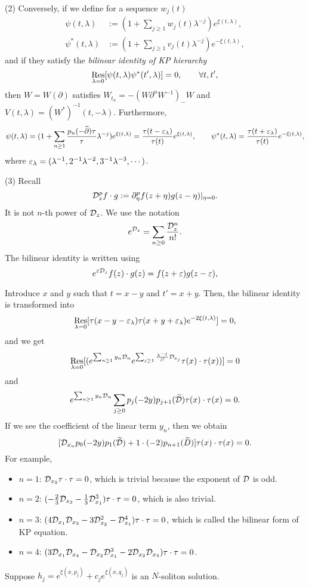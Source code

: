 \documentclass{../../../small}
\begin{document}
(2)
Conversely, if we define for a sequence $w_j(t)$
\begin{align*}
\psi(t,\lambda)&:=(1+\sum_{j\ge1}w_j(t)\lambda^{-j})e^{\xi(t,\lambda)},\\
\psi^*(t,\lambda)&:=(1+\sum_{j\ge1}v_j(t)\lambda^{-j})e^{-\xi(t,\lambda)},
\end{align*}
and if they satisfy the \emph{bilinear identity of KP hierarchy}
\[\operatorname*{Res}_{\lambda=0}[\psi(t,\lambda)\psi^*(t',\lambda)]=0,\qquad\forall t,t',\]
then $W=W(\partial)$ satisfies $W_{t_n}=-(W\partial^nW^{-1})_-W$ and $V(t,\lambda)=(W^*)^{-1}(t,-\lambda)$.
Furthermore,
\[\psi(t,\lambda)=(1+\sum_{n\ge1}\frac{p_n(-\widetilde\partial)\tau}\tau \lambda^{-j})e^{\xi(t,\lambda)}=\frac{\tau(t-\varepsilon_\lambda)}{\tau(t)}e^{\xi(t,\lambda)},\qquad \psi^*(t,\lambda)=\frac{\tau(t+\varepsilon_\lambda)}{\tau(t)}e^{-\xi(t,\lambda)},\]
where $\varepsilon_\lambda=(\lambda^{-1},2^{-1}\lambda^{-2},3^{-1}\lambda^{-3},\cdots)$.

(3)
Recall
\[\mathcal{D}_z^pf\cdot g:=\partial_\eta^pf(z+\eta)g(z-\eta)|_{\eta=0}.\]
It is not $n$-th power of $\mathcal{D}_z$.
We use the notation
\[e^{\mathcal{D}_z}=\sum_{n\ge0}\frac{\mathcal{D}_z^n}{n!}.\]
The bilinear identity is written using
\[e^{\varepsilon\mathcal{D}_z}f(z)\cdot g(z)=f(z+\varepsilon)g(z-\varepsilon),\]


Introduce $x$ and $y$ such that $t=x-y$ and $t'=x+y$.
Then, the bilinear identity is transformed into
\[\operatorname*{Res}_{\lambda=0}[\tau(x-y-\varepsilon_\lambda)\tau(x+y+\varepsilon_\lambda)e^{-2\xi(t,\lambda)}]=0,\]
and we get
\[\operatorname*{Res}_{\lambda=0}[(e^{\sum_{n\ge1}y_n\mathcal{D}_n}e^{\sum_{j\ge1}\frac{\lambda^{-j}}{j!}\mathcal{D}_{x_j}}\tau(x)\cdot\tau(x))]=0\]
and
\[e^{\sum_{n\ge1}y_n\mathcal{D}_n}\sum_{j\ge0}p_j(-2y)p_{j+1}(\widetilde{\mathcal{D}})\tau(x)\cdot\tau(x)=0.\]
If we see the coefficient of the linear term $y_n$, then we obtain
\[[\mathcal{D}_{x_n}p_0(-2y)p_1(\widetilde{\mathcal{D}})+1\cdot(-2)p_{n+1}(\widetilde D)]\tau(x)\cdot\tau(x)=0.\]
For example,
\begin{itemize}
\item $n=1$: $\mathcal{D}_{x_2}\tau\cdot\tau=0$, which is trivial because the exponent of $\mathcal{D}$ is odd.
\item $n=2$: $(-\frac23\mathcal{D}_{x_3}-\frac13\mathcal{D}_{x_1}^3)\tau\cdot\tau=0$, which is also trivial.
\item $n=3$: $(4\mathcal{D}_{x_1}\mathcal{D}_{x_3}-3\mathcal{D}_{x_2}^2-\mathcal{D}_{x_1}^4)\tau\cdot\tau=0$, which is called the bilinear form of KP equation.
\item $n=4$: $(3\mathcal{D}_{x_1}\mathcal{D}_{x_4}-\mathcal{D}_{x_2}\mathcal{D}_{x_1}^3-2\mathcal{D}_{x_2}\mathcal{D}_{x_3})\tau\cdot\tau=0$.
\end{itemize}


Suppose $h_j=e^{\xi(x,p_j)}+c_je^{\xi(x,q_j)}$ is an $N$-soliton solution.
\end{document}
